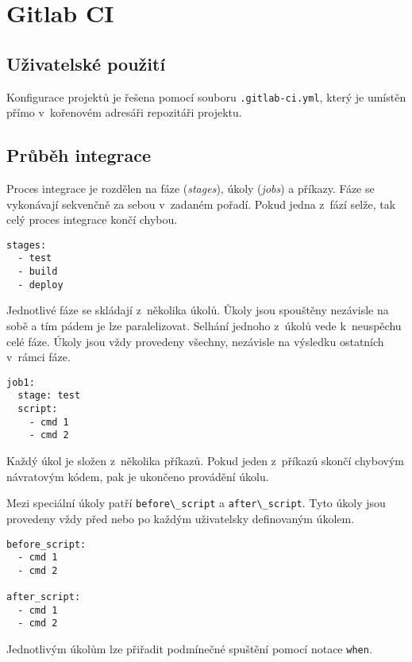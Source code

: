 \chapter{Gitlab CI}

\section{Uživatelské použití}

Konfigurace projektů je řešena pomocí souboru \verb|.gitlab-ci.yml|, který je umístěn přímo v~kořenovém adresáři repozitáři projektu.

\section{Průběh integrace}

Proces integrace je rozdělen na fáze (\textit{stages}), úkoly (\textit{jobs}) a příkazy.
Fáze se vykonávají sekvenčně za sebou v~zadaném pořadí.
Pokud jedna z~fází selže, tak celý proces integrace končí chybou.

\begin{verbatim}
stages:
  - test
  - build
  - deploy
\end{verbatim}

Jednotlivé fáze se skládají z~několika úkolů.
Ůkoly jsou spouštěny nezávisle na sobě a tím pádem je lze paralelizovat.
Selhání jednoho z~úkolů vede k~neuspěchu celé fáze.
Úkoly jsou vždy provedeny všechny, nezávisle na výsledku ostatních v~rámci fáze.


\begin{verbatim}
job1:
  stage: test
  script:
    - cmd 1
    - cmd 2
\end{verbatim}

Každý úkol je složen z~několika příkazů.
Pokud jeden z~příkazů skončí chybovým návratovým kódem, pak je ukončeno provádění úkolu.

Mezi speciální úkoly patří \verb|before\_script| a \verb|after\_script|.
Tyto úkoly jsou provedeny vždy před nebo po každým uživatelsky definovaným úkolem.

\begin{verbatim}
before_script:
  - cmd 1
  - cmd 2

after_script:
  - cmd 1
  - cmd 2
\end{verbatim}

Jednotlivým úkolům lze přiřadit podmínečné spuštění pomocí notace \verb|when|.

